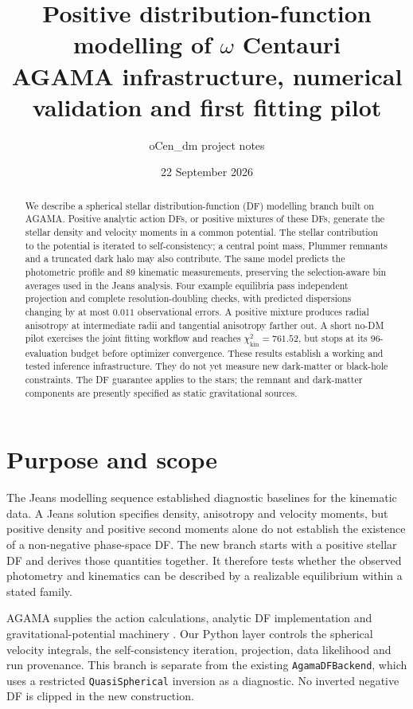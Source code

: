 \documentclass[11pt,a4paper]{article}
\title{\vspace{-1cm}Positive distribution-function modelling of $\omega$ Centauri\\[4pt]
\large AGAMA infrastructure, numerical validation and first fitting pilot}
\author{oCen\_dm project notes}
\date{22 September 2026}
\newcommand{\kin}{\mathrm{kin}}
\begin{document}
\maketitle
\begin{abstract}
We describe a spherical stellar distribution-function (DF) modelling branch
built on AGAMA. Positive analytic action DFs, or positive mixtures of these
DFs, generate the stellar density and velocity moments in a common potential.
The stellar contribution to the potential is iterated to self-consistency;
a central point mass, Plummer remnants and a truncated dark halo may also
contribute. The same model predicts the photometric profile and 89 kinematic
measurements, preserving the selection-aware bin averages used in the Jeans
analysis. Four example equilibria pass independent projection and complete
resolution-doubling checks, with predicted dispersions changing by at most
$0.011$ observational errors. A positive mixture produces radial anisotropy
at intermediate radii and tangential anisotropy farther out. A short no-DM
pilot exercises the joint fitting workflow and reaches
$\chi^2_\kin=761.52$, but stops at its 96-evaluation budget before optimizer
convergence. These results establish a working and tested inference
infrastructure. They do not yet measure new dark-matter or black-hole
constraints. The DF guarantee applies to the stars; the remnant and dark-matter
components are presently specified as static gravitational sources.
\end{abstract}

\section{Purpose and scope}

The Jeans modelling sequence established diagnostic baselines for the
kinematic data. A Jeans solution specifies density, anisotropy and velocity
moments, but positive density and positive second moments alone do not
establish the existence of a non-negative phase-space DF. The new branch
starts with a positive stellar DF and derives those quantities together.
It therefore tests whether the observed photometry and kinematics can be
described by a realizable equilibrium within a stated family.

AGAMA supplies the action calculations, analytic DF implementation and
gravitational-potential machinery \cite{vasiliev2019,agama_manual}. Our
Python layer controls the spherical velocity integrals, the self-consistency
iteration, projection, data likelihood and run provenance. This branch is
separate from the existing \texttt{AgamaDFBackend}, which uses a restricted
\texttt{QuasiSpherical} inversion as a diagnostic. No inverted negative DF is
clipped in the new construction.
\end{document}
